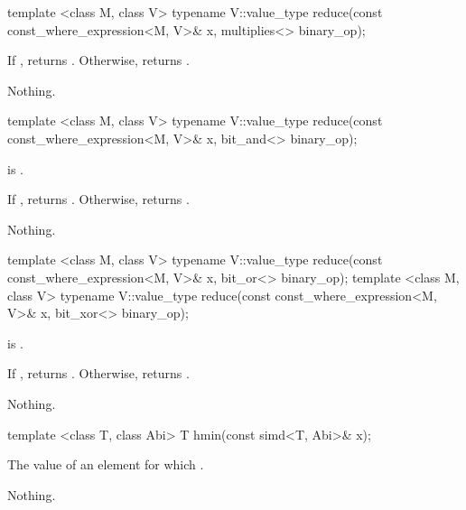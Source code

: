 \begin{itemdecl}
template <class M, class V>
typename V::value_type reduce(const const_where_expression<M, V>& x, multiplies<> binary_op);
\end{itemdecl}
\begin{itemdescr}
  \pnum\returns
  If , returns .
  Otherwise, returns  .

  \pnum\throws Nothing.
\end{itemdescr}

\begin{itemdecl}
template <class M, class V>
typename V::value_type reduce(const const_where_expression<M, V>& x, bit_and<> binary_op);
\end{itemdecl}
\begin{itemdescr}
  \pnum\requires {} is \true.

  \pnum\returns
  If , returns .
  Otherwise, returns  .

  \pnum\throws Nothing.
\end{itemdescr}

\begin{itemdecl}
template <class M, class V>
typename V::value_type reduce(const const_where_expression<M, V>& x, bit_or<> binary_op);
template <class M, class V>
typename V::value_type reduce(const const_where_expression<M, V>& x, bit_xor<> binary_op);
\end{itemdecl}
\begin{itemdescr}
  \pnum\requires {} is \true.

  \pnum\returns
  If , returns .
  Otherwise, returns  .

  \pnum\throws Nothing.
\end{itemdescr}

\begin{itemdecl}
template <class T, class Abi> T hmin(const simd<T, Abi>& x);
\end{itemdecl}
\begin{itemdescr}
  \pnum\returns The value of an element  for which  \foralli.

  \pnum\throws Nothing.
\end{itemdescr}

